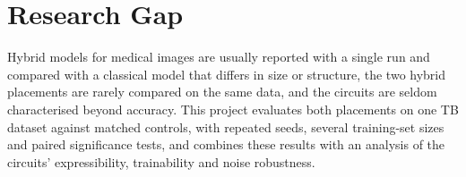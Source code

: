 \section{Research Gap}
Hybrid models for medical images are usually reported with a single run
and compared with a classical model that differs in size or structure, the
two hybrid placements are rarely compared on the same data, and the
circuits are seldom characterised beyond accuracy. This project evaluates
both placements on one TB dataset against matched controls, with repeated
seeds, several training-set sizes and paired significance tests, and
combines these results with an analysis of the circuits' expressibility,
trainability and noise robustness.
